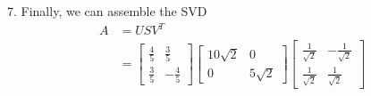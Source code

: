 \documentclass[12pt]{article}
\begin{document}
7. Finally, we can assemble the SVD
\begin{align}
    A & = USV^T                                                                                 \\
      & = \begin{bmatrix} \frac{4}{5} & \frac{3}{5} \\ \frac{3}{5} & -\frac{4}{5} \end{bmatrix}
    \begin{bmatrix} 10\sqrt{2} & 0 \\ 0 & 5\sqrt{2} \end{bmatrix}
    \begin{bmatrix} \frac{1}{\sqrt{2}} & -\frac{1}{\sqrt{2}} \\ \frac{1}{\sqrt{2}} & \frac{1}{\sqrt{2}} \end{bmatrix}
\end{align}
\end{document}
